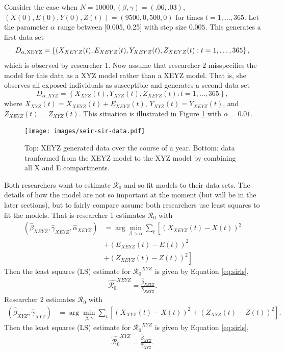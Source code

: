 \documentclass[12pt]{article}
\newcommand{\rr}{\ensuremath{\mathcal{R}_0}}
\begin{document}
Consider the case when $N=10000, (\beta, \gamma) = (.06, .03)$, $(X(0), E(0), Y(0), Z(t)) = (9500, 0, 500, 0)$ for times $t=1, \dots, 365$.  Let the parameter $\alpha$ range between [0.005, 0.25] with step size $0.005$.  This generates a first data set
$$D_{\alpha, \textnormal{XEYZ}} = \left \{(X_{XEYZ}(t), E_{XEYZ}(t), Y_{XEYZ}(t), Z_{XEYZ}(t): t=1, \dots, 365\right \},$$
which is observed by researcher 1.  Now assume that researcher 2 misspecifies the model for this data as a XYZ model rather than a XEYZ model.  That is, she observes all exposed individuals as susceptible and generates a second data set
$$D_{\alpha, XYZ} = \left \{X_{XYZ}(t), Y_{XYZ}(t), Z_{XEYZ}(t) : t = 1, \dots, 365 \right \},$$
where $X_{XYZ}(t) = X_{XEYZ}(t) + E_{XEYZ}(t)$, $Y_{XYZ}(t) = Y_{XEYZ}(t)$, and  $Z_{XEYZ}(t) = Z_{XYZ}(t)$. This situation is illustrated in Figure \ref{fig:sir-vs-seir} with $\alpha = 0.01$.

\begin{figure}
  \centering
  \texttt{[image: images/seir-sir-data.pdf]}
  \caption{Top: XEYZ generated data over the course of a year.  Bottom: data tranformed from the XEYZ model to the XYZ model by combining all X and E compartments.}\label{fig:sir-vs-seir}
  \end{figure}

Both researchers want to estimate $\rr$ and so fit models to their data sets.  The details of how the model are not so important at the moment (but will be in the later sections), but to fairly compare assume both researchers use least squares to fit the models.  That is researcher 1 estimates $\rr$ with
\begin{align*}
  (\hat{\beta}_{XEYZ}, \hat{\gamma}_{XEYZ}, \hat{\alpha}_{XEYZ} )&=\arg \min_{\beta, \gamma, \alpha} \sum_{t} \left [ \left (X_{XEYZ}(t) - X(t)\right )^2  \right . \\
                                                                 &+\left ( E_{XEYZ}(t) - E(t) \right )^2  \\
  &\left . + \left ( Z_{XEYZ}(t) - Z(t) \right )^2\right ]
\end{align*}
Then the least squares (LS) estimate for $\rr^{XYZ}$ is given by Equation \ref{eq:sirls},
\begin{align*}
  \hat{\rr}^{XEYZ}= \frac{\hat{\beta}_{XEYZ}}{\hat{\gamma}_{XEYZ}}.
\end{align*}
Researcher 2 estimates $\rr$ with 
\begin{align*}
(\hat{\beta}_{XYZ}, \hat{\gamma}_{XYZ} )&=\arg \min_{\beta, \gamma} \sum_{t} \left [ \left (X_{XYZ}(t) - X(t)\right )^2 + \left ( Z_{XYZ}(t) - Z(t) \right )^2 \right ].
\end{align*}
Then the least squares (LS) estimate for $\rr^{XYZ}$ is given by Equation \ref{eq:sirls},
\begin{align*}
  \hat{\rr}^{XYZ}= \frac{\hat{\beta}_{XYZ}}{\hat{\gamma}_{XYZ}}.
\end{align*}
\end{document}
